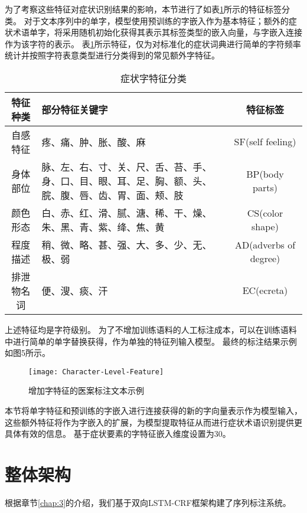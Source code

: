为了考察这些特征对症状识别结果的影响，本节进行了如表\ref{tab:symptom_cluster}所示的特征标签分类。
对于文本序列中的单字，模型使用预训练的字嵌入作为基本特征；额外的症状术语单字，将采用随机初始化获得其表示其标签类型的嵌入向量，与字嵌入连接作为该字符的表示。
表\ref{tab:symptom_cluster}所示特征，仅为对标准化的症状词典进行简单的字符频率统计并按照字符表意类型进行分类得到的常见额外字特征。
\begin{table}[H]
    \centering
    \footnotesize
    \setlength{\tabcolsep}{4pt}
    \renewcommand{\arraystretch}{1.2}
    \begin{tabular}{cp{5cm}c}
        \toprule
        特征种类 & 部分特征关键字 & 特征标签\\
        \midrule
        自感特征 & 疼、痛、肿、胀、酸、麻 & SF(self feeling)\\
        \midrule
        身体部位 & 脉、左、右、寸、关、尺、舌、苔、手、身、口、目、眼、耳、足、胸、额、头、脘、腹、唇、齿、胃、面、颊、肢 & BP(body parts)\\
        \midrule
        颜色形态 & 白、赤、红、滑、腻、溏、稀、干、燥、朱、黑、青、紫、绛、焦、黄 & CS(color shape)\\
        \midrule
        程度描述 & 稍、微、略、甚、强、大、多、少、无、极、弱 & AD(adverbs of degree) \\
        \midrule
        排泄物名词 & 便、溲、痰、汗 & EC(ecreta)\\
        \bottomrule
    \end{tabular}
    \caption{症状字特征分类}
    \label{tab:symptom_cluster}
\end{table}

上述特征均是字符级别。
为了不增加训练语料的人工标注成本，可以在训练语料中进行简单的单字替换获得，作为单独的特征列输入模型。
最终的标注结果示例如图5所示。
\begin{figure}[H]
    \centering
    \texttt{[image: Character-Level-Feature]}
    \caption{增加字特征的医案标注文本示例}
    \label{fig:character_level_feature}
\end{figure}

本节将单字特征和预训练的字嵌入进行连接获得的新的字向量表示作为模型输入，这些额外特征将作为字嵌入的扩展，为模型提取特征从而进行症状术语识别提供更具体有效的信息。
基于症状要素的字特征嵌入维度设置为30。

\section{整体架构}
根据章节\ref{chap:3}的介绍，我们基于双向LSTM-CRF框架构建了序列标注系统。


